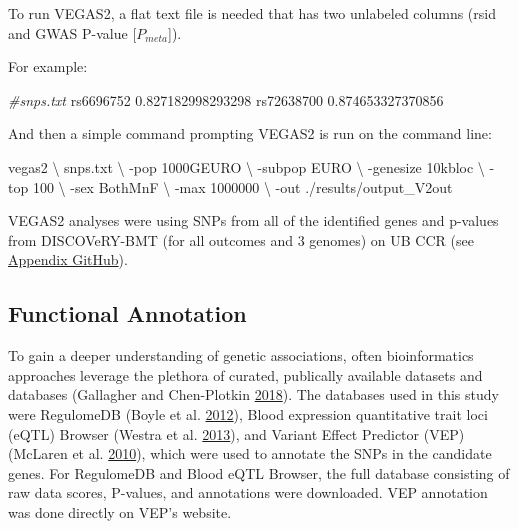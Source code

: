 \documentclass[]{DissertateOSU}
\newenvironment{Shaded}{\begin{snugshade}}{\end{snugshade}}
\newcommand{\CommentTok}[1]{\textcolor[rgb]{0.56,0.35,0.01}{\textit{#1}}}
\newcommand{\ExtensionTok}[1]{#1}
\newcommand{\NormalTok}[1]{#1}
\begin{document}
To run VEGAS2, a flat text file is needed that has two unlabeled columns
(rsid and GWAS P-value {[}\(P_{meta}\){]}).

\noindent For example:

\singlespaced

\begin{Shaded}
\begin{Highlighting}[]
\CommentTok{#snps.txt}
\ExtensionTok{rs6696752}\NormalTok{   0.827182998293298}
\ExtensionTok{rs72638700}\NormalTok{  0.874653327370856}
\end{Highlighting}
\end{Shaded}

\doublespaced

\noindent And then a simple command prompting VEGAS2 is run on the
command line:

\singlespaced

\begin{Shaded}
\begin{Highlighting}[]
\ExtensionTok{vegas2}\NormalTok{ \textbackslash{}}
\NormalTok{    snps.txt \textbackslash{}}
\NormalTok{    -pop 1000GEURO \textbackslash{}}
\NormalTok{    -subpop EURO \textbackslash{}}
\NormalTok{    -genesize 10kbloc \textbackslash{}}
\NormalTok{    -top 100 \textbackslash{}}
\NormalTok{    -sex BothMnF \textbackslash{}}
\NormalTok{    -max 1000000 \textbackslash{}}
\NormalTok{    -out ./results/output_V2out }
\end{Highlighting}
\end{Shaded}

\doublespaced
\noindent VEGAS2 analyses were using SNPs from all of the identified
genes and p-values from DISCOVeRY-BMT (for all outcomes and 3 genomes)
on UB CCR (see
\href{https://github.com/aarizvi/dissertation/tree/master/code/chapter2}{Appendix
GitHub}).

\subsection{Functional Annotation}\label{functional-annotation}

To gain a deeper understanding of genetic associations, often
bioinformatics approaches leverage the plethora of curated, publically
available datasets and databases (Gallagher and Chen-Plotkin
\protect\hyperlink{ref-gallagher_2018}{2018}). The databases used in
this study were RegulomeDB (Boyle et al.
\protect\hyperlink{ref-Boyle_2012}{2012}), Blood expression quantitative
trait loci (eQTL) Browser (Westra et al.
\protect\hyperlink{ref-westra_2013}{2013}), and Variant Effect Predictor
(VEP) (McLaren et al. \protect\hyperlink{ref-vep_2010}{2010}), which
were used to annotate the SNPs in the candidate genes. For RegulomeDB
and Blood eQTL Browser, the full database consisting of raw data scores,
P-values, and annotations were downloaded. VEP annotation was done
directly on VEP's website.
\end{document}
